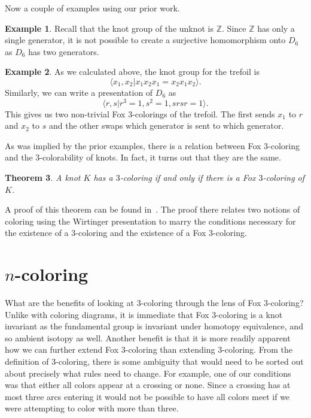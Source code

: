 \documentclass[12pt]{amsart}
\newtheorem{theorem}{Theorem}[section]
\theoremstyle{definition}
\newtheorem{example}[theorem]{Example}
\theoremstyle{remark}
\numberwithin{equation}{section}
\newcommand{\bb}[1]{\mathbb{#1}}
\begin{document}
Now a couple of examples using our prior work.

\begin{example}
  Recall that the knot group of the unknot is $\bb{Z}$. Since
  $\bb{Z}$ has only a single generator, it is not possible to
  create a surjective homomorphism onto $D_6$ as $D_6$ has
  two generators.
\end{example}

\begin{example}
  As we calculated above, the knot group for the trefoil is
  \[
    \langle x_1,x_2| x_1x_2x_1=x_2x_1x_2\rangle.
  \]
  Similarly, we can write a presentation of $D_6$ as
  \[
    \langle r,s| r^3=1, s^2=1,srsr=1\rangle.
  \]
  This gives us two non-trivial Fox $3$-colorings of the trefoil.
  The first sends $x_1$ to $r$ and $x_2$ to $s$ and the
  other swaps which generator is sent to which generator.
\end{example}

As was implied by the prior examples, there is a relation between
Fox $3$-coloring and the $3$-colorability of knots. In fact, it turns
out that they are the same.

\begin{theorem}
  A knot $K$ has a $3$-coloring if and only if there is a
  Fox $3$-coloring of $K$.
\end{theorem}

A proof of this theorem can be found in~\cite{medwid}. 
The proof there relates two notions of coloring using
the Wirtinger presentation to marry the conditions necessary
for the existence of a $3$-coloring and the existence of a Fox
$3$-coloring.

\section{$n$-coloring}
\label{sec:n-coloring}

What are the benefits of looking at $3$-coloring through
the lens of Fox $3$-coloring? Unlike with coloring diagrams,
it is immediate that Fox $3$-coloring is a knot invariant
as the fundamental group is invariant under homotopy equivalence, and
so ambient isotopy as well. Another benefit
is that it is more readily apparent how we can further
extend Fox $3$-coloring than extending $3$-coloring. From
the definition of $3$-coloring, there is some ambiguity that
would need to be sorted out about precisely what rules need
to change. For example, one of our conditions was that either
all colors appear at a crossing or none. Since a crossing has
at most three arcs entering it would not be possible to have
all colors meet if we were attempting to color with more than three.
\end{document}
